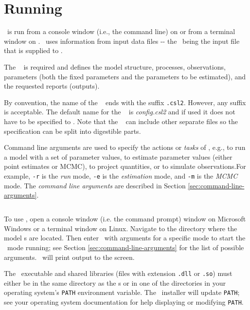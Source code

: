 \section{Running \CNAME\label{sec:running}}

\CNAME~is run from a console window (i.e., the command line) on  or from a terminal window on . \CNAME~uses information from input data files -{}- the \emph{\config{}}\ being the input file that is supplied to \CNAME.

The \config~ is required and defines the model structure, processes, observations, parameters (both the fixed parameters and the parameters to be estimated), and the  requested reports (outputs).

By convention, the name of the \config~ ends with the suffix \texttt{.csl2}. However, any suffix is acceptable. The default name for the \config~ is \emph{config.csl2} and if used it does not have to be specified to \CNAME. Note that the \config~ can include other separate files so the specification can be split into digestible parts. 

Command line arguments are used to specify the actions or \emph{tasks} of \CNAME, e.g., to run a model with a set of parameter values, to estimate parameter values (either point estimates or MCMC), to project quantities, or to simulate observations.For example, \texttt{-r} is the \emph{run} mode, \texttt{-e} is the \emph{estimation} mode, and \texttt{-m} is the \emph{MCMC} mode. The \emph{command line arguments} are described in Section \ref{sec:command-line-arguments}.

\subsection{}

To use \CNAME, open a console window (i.e. the command prompt) window on Microsoft Windows or a terminal window on Linux. Navigate to the directory where the model \config s are located. Then enter \cname~with arguments for a specific mode to start the \CNAME~mode running; see Section \ref{sec:command-line-arguments} for the list of possible arguments. \CNAME~will print output to the screen.

The \CNAME~executable and shared libraries (files with extension \texttt{.dll} or \texttt{.so}) must either be in the same directory as the \config s or in one of the directories in your operating system's \texttt{PATH} environment variable. The \CNAME~installer will update \texttt{PATH}; see your operating system documentation for help displaying or modifying \texttt{PATH}.

